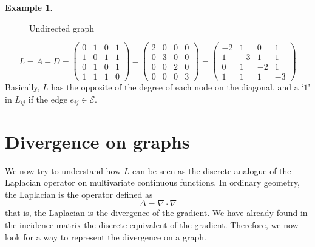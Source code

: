 \documentclass[12pt,a4paper]{report}
\theoremstyle{definition}
\newtheorem{example}{Example}[chapter]
\begin{document}
\begin{example}
\begin{figure}[h]
\begin{tikzpicture}[x=0.75pt,y=0.75pt,yscale=-1,xscale=1]
    
    \end{tikzpicture}
    \caption{Undirected graph}
    \label{fig:L_G_undirected}
\end{figure}

\begin{equation*}
    L = A - D =
    \begin{pmatrix}
    0 & 1 & 0 & 1 \\
    1 & 0 & 1 & 1 \\
    0 & 1 & 0 & 1 \\
    1 & 1 & 1 & 0 
    \end{pmatrix} -
    \begin{pmatrix}
    2 & 0 & 0 & 0 \\
    0 & 3 & 0 & 0 \\
    0 & 0 & 2 & 0 \\
    0 & 0 & 0 & 3
    \end{pmatrix} = 
    \begin{pmatrix}
    -2 & 1 & 0 & 1 \\
    1 & -3 & 1 & 1 \\
    0 & 1 & -2 & 1 \\
    1 & 1 & 1 & -3 
    \end{pmatrix}
\end{equation*}
Basically, $L$ has the opposite of the degree of each node on the diagonal, and a `$1$' in $L_{ij}$ if the edge $e_{ij} \in \mathcal{E}$.
\end{example}

\section{Divergence on graphs}
\label{sec:divergence}

We now try to understand how $L$ can be seen as the discrete analogue of the Laplacian operator on multivariate continuous functions.
In ordinary geometry, the Laplacian is the operator defined as
\begin{equation*}
    \Delta  = \nabla \cdot \nabla
\end{equation*}
that is, the Laplacian is the divergence of the gradient.
We have already found in the incidence matrix the discrete equivalent of the gradient.
Therefore, we now look for a way to represent the divergence on a graph.
\end{document}

